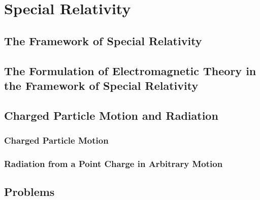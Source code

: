 \setcounter{chapter}{0}
\renewcommand{\thechapter}{8}
\chapter{Special Relativity}
\setcounter{equation}{0}	        %

\section{The Framework of Special Relativity}

\section{The Formulation of Electromagnetic Theory in the Framework of Special Relativity}

\section{Charged Particle Motion and Radiation}

\subsection{Charged Particle Motion}

\subsection{Radiation from a Point Charge in Arbitrary Motion}


\section*{Problems}


